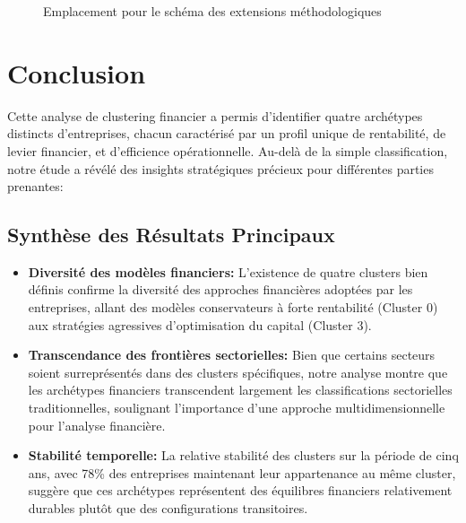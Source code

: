 \begin{figure}[H]
    \centering
    \caption{Emplacement pour le schéma des extensions méthodologiques}
    \label{fig:extensions}
\end{figure}

\section{Conclusion}
Cette analyse de clustering financier a permis d'identifier quatre archétypes distincts d'entreprises, chacun caractérisé par un profil unique de rentabilité, de levier financier, et d'efficience opérationnelle. Au-delà de la simple classification, notre étude a révélé des insights stratégiques précieux pour différentes parties prenantes:

\subsection{Synthèse des Résultats Principaux}
\begin{itemize}
    \item \textbf{Diversité des modèles financiers:} L'existence de quatre clusters bien définis confirme la diversité des approches financières adoptées par les entreprises, allant des modèles conservateurs à forte rentabilité (Cluster 0) aux stratégies agressives d'optimisation du capital (Cluster 3).
    
    \item \textbf{Transcendance des frontières sectorielles:} Bien que certains secteurs soient surreprésentés dans des clusters spécifiques, notre analyse montre que les archétypes financiers transcendent largement les classifications sectorielles traditionnelles, soulignant l'importance d'une approche multidimensionnelle pour l'analyse financière.
    
    \item \textbf{Stabilité temporelle:} La relative stabilité des clusters sur la période de cinq ans, avec 78\% des entreprises maintenant leur appartenance au même cluster, suggère que ces archétypes représentent des équilibres financiers relativement durables plutôt que des configurations transitoires.
\end{itemize}

